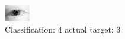 \begin{figure}[h!]
\begin{center}
\includegraphics[width=0.60\columnwidth]{figures/ID46_class_4_target_3.png}
\end{center}
\caption{ Classification: 4 actual target: 3}
\label{fig:ID46_class_4_target_3}
\end{figure}
